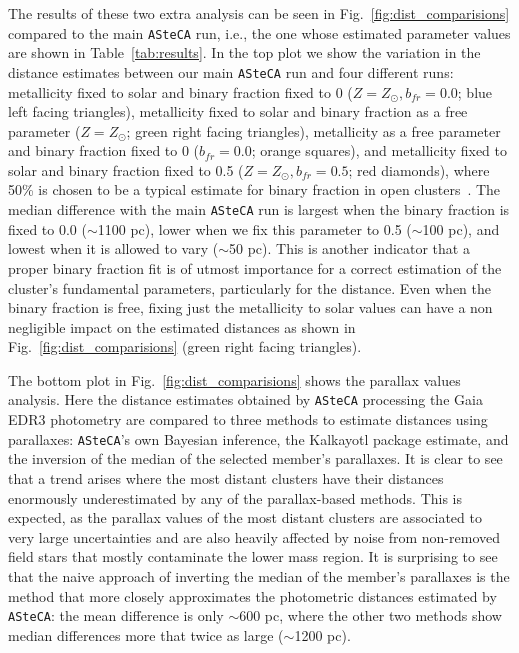 \documentclass{aa}
\begin{document}
  The results of these two extra analysis can be seen in
  Fig.~\ref{fig:dist_comparisions} compared to the main \texttt{ASteCA} run,
  i.e., the one whose estimated parameter values are shown in
  Table~\ref{tab:results}.
  In the top plot we show the variation in the distance estimates between our
  main \texttt{ASteCA} run and four different runs: metallicity fixed to solar
  and binary fraction fixed to 0 ($Z=Z_{\odot},b_{fr}=0.0$; blue left
  facing triangles), metallicity fixed to solar and binary fraction as a free
  parameter ($Z=Z_{\odot}$; green right facing triangles), metallicity
  as a free parameter and binary fraction fixed to 0 ($b_{fr}=0.0$; orange
  squares), and metallicity fixed to solar and binary fraction fixed to
  0.5 ($Z=Z_{\odot},b_{fr}=0.5$; red diamonds), where 50\% is
  chosen to be a typical estimate for binary fraction in open
  clusters~\citep{vonHippel_2005}.
  The median difference with the main \texttt{ASteCA} run is largest when the
  binary fraction is fixed to 0.0 ($\sim$1100 pc), lower when we fix this
  parameter to 0.5 ($\sim$100 pc), and lowest when it is allowed to vary 
  ($\sim$50 pc). This is another indicator that a proper binary fraction fit is
  of utmost importance for a correct  estimation of the cluster's fundamental
  parameters, particularly for the distance. Even when the binary fraction is
  free, fixing just the metallicity to solar values can have a non
  negligible impact on the estimated distances as shown in
  Fig.~\ref{fig:dist_comparisions} (green right facing triangles).

  The bottom plot in Fig.~\ref{fig:dist_comparisions} shows the parallax values
  analysis. Here the distance estimates obtained by \texttt{ASteCA} processing
  the Gaia EDR3 photometry are compared to three methods to estimate distances
  using parallaxes: \texttt{ASteCA}'s own Bayesian inference, the Kalkayotl
  package estimate, and the inversion of the median of the selected member's
  parallaxes. It is clear to see that a trend arises where the most distant
  clusters have their distances enormously underestimated by any of the
  parallax-based methods. This is expected, as the parallax values of the most
  distant clusters are associated to very large uncertainties and are also
  heavily affected by noise from non-removed field stars that mostly contaminate
  the lower mass region.
  It is surprising to see that the naive approach of inverting the median of
  the member's parallaxes is the method that more closely approximates the
  photometric distances estimated by \texttt{ASteCA}: the mean difference is
  only $\sim$600 pc, where the other two methods show median differences more
  that twice as large ($\sim$1200 pc).
  \\
\end{document}
